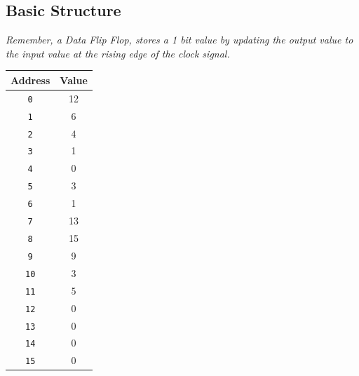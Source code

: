 \subsection{Basic Structure}
\textit{Remember, a Data Flip Flop, stores a 1 bit value by updating the output value to the input value at the rising edge of the clock signal.} \\ \vspace*{5px}
\begin{minipage}[htp]{0.35\textwidth} 
\begin{center}
    \begin{tabular}{|c|c|}
        \hline
        \textbf{Address} & \textbf{Value} \\ 
        \hline
        \texttt{0} & 12 \\ 
        \hline
        \texttt{1} & 6 \\ 
        \hline
        \texttt{2} & 4 \\ 
        \hline
        \texttt{3} & 1 \\ 
        \hline
        \texttt{4} & 0 \\ 
        \hline
        \texttt{5} & 3 \\ 
        \hline
        \texttt{6} & 1 \\ 
        \hline
        \texttt{7} & 13 \\ 
        \hline
        \texttt{8} & 15 \\ 
        \hline
        \texttt{9} & 9 \\ 
        \hline
        \texttt{10} & 3 \\ 
        \hline
        \texttt{11} & 5 \\ 
        \hline
        \texttt{12} & 0 \\ 
        \hline
        \texttt{13} & 0 \\ 
        \hline
        \texttt{14} & 0 \\ 
        \hline
        \texttt{15} & 0 \\ 
        \hline
        \end{tabular}
\end{center}
\end{minipage}
\hfill
\vline
\hfill
